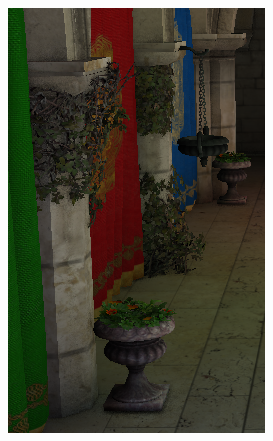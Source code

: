 \begin{figure}[htb]
\begin{subfigure}[b]{0.333\textwidth}
        \includegraphics[width=.95\textwidth]{screenshots/interleaved_with_textured}%
        \caption{}
        \label{fig:results:interleaved_with_textured}%
    \end{subfigure}%
    \begin{subfigure}[b]{0.333\textwidth}
        \centering

\end{subfigure}
\end{figure}
